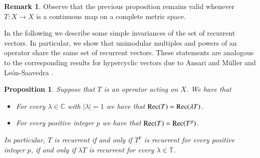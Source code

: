 \documentclass[12pt,leqno]{amsart}
\theoremstyle{plain}
\newtheorem{proposition}[equation]{Proposition}
\theoremstyle{definition}
\newtheorem{remark}[equation]{Remark}
\numberwithin{equation}{section}
\begin{document}
\begin{remark}
	Observe that the previous proposition remains valid whenever $T:X\to X$ is a continuous map on a complete metric space. 
\end{remark}

In the following we describe some simple invariances of the set of recurrent vectors. In particular, we show that unimodular multiples and powers of an operator share the same set of recurrent vectors. These statements are analogous to the corresponding results for hypercyclic vectors due to Ansari \cite{A1} and M\"uller and Le\'on-Saavedra \cite{MULS}.

\begin{proposition}\label{p.invariances}
	Suppose that $T$ is an operator acting on $X$. We have that 
	\begin{itemize}
		\item [(i)] For every $\lambda \in\mathbb C$ with $|\lambda|=1$ we have that $\textnormal{\textnormal{Rec}}(T)=\textnormal{\textnormal{Rec}}(\lambda T)$. 
		\item [(ii)] For every positive integer $p$ we have that $\textnormal{\textnormal{Rec}}(T)=\textnormal{\textnormal{Rec}}(T^p)$. 
	\end{itemize}
	In particular, $T$ is recurrent if and only if $T^p$ is recurrent for every positive integer $p$, if and only if $\lambda T$ is recurrent for every $\lambda \in \mathbb T$. 
\end{proposition}
\end{document}

